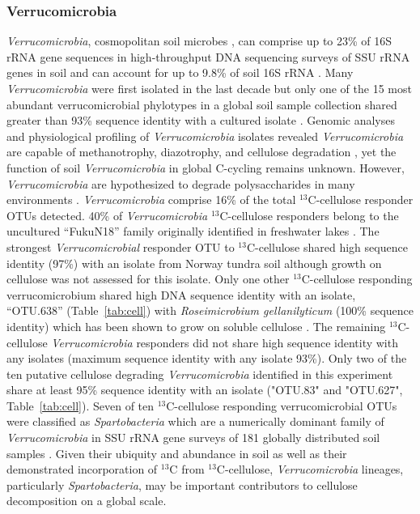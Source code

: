 \documentclass{article}
\begin{document}
\subsubsection{Verrucomicrobia}\label{cell:verruc}
\textit{Verrucomicrobia}, cosmopolitan soil microbes
\citep{Bergmann_2011}, can comprise up to 23\% of 16S rRNA gene sequences in
high-throughput DNA sequencing surveys of SSU rRNA genes in soil
\citep{Bergmann_2011} and can account for up to 9.8\% of
soil 16S rRNA \citep{Buckley_2001}. Many \textit{Verrucomicrobia} were first
isolated in the last decade \citep{Wertz_2011} but only one of the 15 most
abundant verrucomicrobial phylotypes in a global soil sample collection shared
greater than 93\% sequence identity with a cultured isolate
\citep{Bergmann_2011}. Genomic analyses and physiological profiling of
\textit{Verrucomicrobia} isolates revealed \textit{Verrucomicrobia} are capable
of methanotrophy, diazotrophy, and cellulose degradation \citep{Otsuka_2012,
Wertz_2011}, yet the function of soil \textit{Verrucomicrobia} in global
C-cycling remains unknown. However, \textit{Verrucomicrobia} are hypothesized
to degrade polysaccharides in many environments
\citep{Fierer_2013,Herlemann_2013,10543821}. \textit{Verrucomicrobia} comprise
16\% of the total $^{13}$C-cellulose responder OTUs detected. 40\% of
\textit{Verrucomicrobia} $^{13}$C-cellulose responders belong to the uncultured
``FukuN18'' family originally identified in freshwater lakes
\citep{Parveen_2013}.  The strongest \textit{Verrucomicrobial} responder OTU to
$^{13}$C-cellulose shared high sequence identity (97\%) with an isolate from
Norway tundra soil \citep{Jiang_2011} although growth on cellulose was not
assessed for this isolate. Only one other $^{13}$C-cellulose responding
verrucomicrobium shared high DNA sequence identity with an isolate, ``OTU.638''
(Table~\ref{tab:cell}) with \textit{Roseimicrobium gellanilyticum} (100\%
sequence identity) which has been shown to grow on soluble cellulose
\citep{Otsuka_2012}. The remaining $^{13}$C-cellulose \textit{Verrucomicrobia}
responders did not share high sequence identity with any isolates (maximum
sequence identity with any isolate 93\%). Only two of the ten putative
cellulose degrading \textit{Verrucomicrobia} identified in this experiment
share at least 95\% sequence identity with an isolate ("OTU.83" and "OTU.627",
Table~\ref{tab:cell}). Seven of ten $^{13}$C-cellulose responding
verrucomicrobial OTUs were classified as \textit{Spartobacteria} which are
a numerically dominant family of \textit{Verrucomicrobia} in SSU rRNA gene
surveys of 181 globally distributed soil samples \citep{Bergmann_2011}. Given
their ubiquity and abundance in soil as well as their demonstrated
incorporation of $^{13}$C from $^{13}$C-cellulose, \textit{Verrucomicrobia}
lineages, particularly \textit{Spartobacteria}, may be important contributors
to cellulose decomposition on a global scale.
\end{document}
